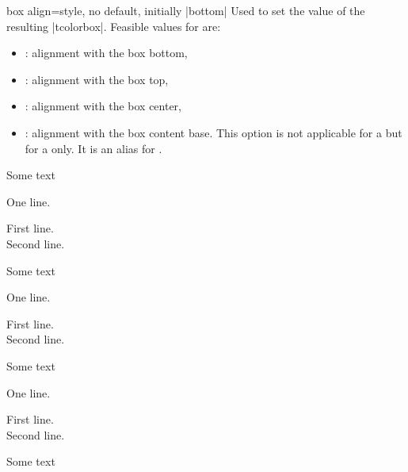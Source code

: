 \begin{docTcbKey}[][doc new=2014-10-10]{box align}{=}{style, no default, initially |bottom|}
  Used to set the  value of the resulting |tcolorbox|.
  Feasible values for  are:
  \begin{itemize}
  \item{}: alignment with the box bottom,
  \item{}: alignment with the box top,
  \item{}: alignment with the box center,
  \item{}: alignment with the box content base. This option
    is not applicable for a  but for a  only.
    It is an alias for .
  \end{itemize}

\begin{dispExample}
Some text\dotfill
\begin{tcolorbox}[box align=bottom]
One line.
\end{tcolorbox}
\begin{tcolorbox}[box align=bottom]
First line.\\Second line.
\end{tcolorbox}
\end{dispExample}

\begin{dispExample}
Some text\dotfill
\begin{tcolorbox}[box align=top]
One line.
\end{tcolorbox}
\begin{tcolorbox}[box align=top]
First line.\\Second line.
\end{tcolorbox}
\end{dispExample}

\begin{dispExample}
Some text\dotfill
\begin{tcolorbox}[box align=center]
One line.
\end{tcolorbox}
\begin{tcolorbox}[box align=center]
First line.\\Second line.
\end{tcolorbox}
\end{dispExample}

\begin{dispExample}
Some text\dotfill
{}
\end{dispExample}
\end{docTcbKey}


